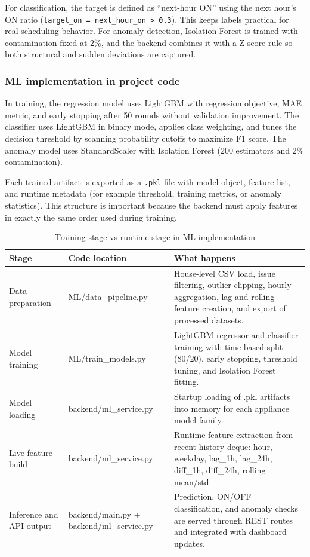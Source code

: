 \documentclass[12pt, a4paper]{article}
\numberwithin{figure}{section}
\numberwithin{table}{section}
\begin{document}
	For classification, the target is defined as ``next-hour ON'' using the next hour's ON ratio (\texttt{target\_on = next\_hour\_on > 0.3}). This keeps labels practical for real scheduling behavior. For anomaly detection, Isolation Forest is trained with contamination fixed at 2\%, and the backend combines it with a Z-score rule so both structural and sudden deviations are captured.
	
	\subsubsection{ML implementation in project code}
	
	In training, the regression model uses LightGBM with regression objective, MAE metric, and early stopping after 50 rounds without validation improvement. The classifier uses LightGBM in binary mode, applies class weighting, and tunes the decision threshold by scanning probability cutoffs to maximize F1 score. The anomaly model uses StandardScaler with Isolation Forest (200 estimators and 2\% contamination).
	
	Each trained artifact is exported as a \texttt{.pkl} file with model object, feature list, and runtime metadata (for example threshold, training metrics, or anomaly statistics). This structure is important because the backend must apply features in exactly the same order used during training.
	
	\begin{table}[H]
		\centering
		\caption{Training stage vs runtime stage in ML implementation}
		\label{tab:ml-implementation-stages}
		\vspace{6pt}
		\footnotesize
		\begin{tabularx}{\textwidth}{|p{3.3cm}|p{4.1cm}|X|}
			\hline
			\textbf{Stage} & \textbf{Code location} & \textbf{What happens} \\
			\hline
			Data preparation & ML/data\_pipeline.py & House-level CSV load, issue filtering, outlier clipping, hourly aggregation, lag and rolling feature creation, and export of processed datasets. \\
			\hline
			Model training & ML/train\_models.py & LightGBM regressor and classifier training with time-based split (80/20), early stopping, threshold tuning, and Isolation Forest fitting. \\
			\hline
			Model loading & backend/ml\_service.py & Startup loading of .pkl artifacts into memory for each appliance model family. \\
			\hline
			Live feature build & backend/ml\_service.py & Runtime feature extraction from recent history deque: hour, weekday, lag\_1h, lag\_24h, diff\_1h, diff\_24h, rolling mean/std. \\
			\hline
			Inference and API output & backend/main.py + backend/ml\_service.py & Prediction, ON/OFF classification, and anomaly checks are served through REST routes and integrated with dashboard updates. \\
			\hline
		\end{tabularx}
		\normalsize
	\end{table}
	
\end{document}
